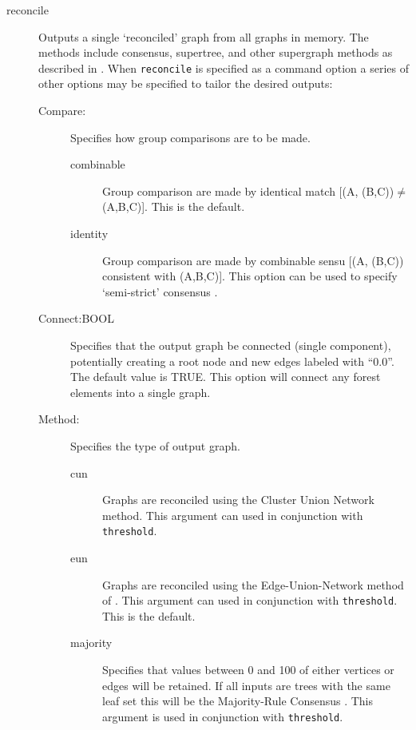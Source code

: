 \begin{description}
		\item[reconcile] Outputs a single `reconciled' graph from all graphs in 
		memory. The methods include consensus, supertree, and other supergraph 
		methods as described in \cite{Wheeler2012, Wheeler2022}. When \texttt{reconcile} 
		is specified as a command option a series of other options may be specified 
		to tailor the desired outputs:
		
		\begin{description}
			\item [Compare:] Specifies how group comparisons are to be made.
						
			\begin{description}
				\item[combinable] Group comparison are made by identical match 
				[(A, (B,C))$\neq$(A,B,C)]. This is the default.	
								
				\item[identity] Group comparison are made by combinable sensu \cite{Nelson1979}
				 [(A, (B,C)) consistent with (A,B,C)]. This option can be used to specify `semi-strict' 
				 consensus \citep{Bremer1990}.
			\end{description}
			
			\item [Connect:BOOL] Specifies that the output graph be connected 
			(single component), potentially creating a root node and new edges labeled 
			with ``0.0''. The default value is TRUE. This option will connect any forest elements
			into a single graph.
			
			\item [Method:] Specifies the type of output graph. 
			
			\begin{description}
				\item[cun] Graphs are reconciled using the Cluster Union Network 
				\citep{Baroni2005} method. This argument can used in conjunction with 
				\texttt{threshold}. 
				
				\item[eun] Graphs are reconciled using the Edge-Union-Network method of 
				\citep{MiyagiandWheeler2019}. This argument can used in conjunction with 
				\texttt{threshold}. This is the default.
				
				\item[majority] Specifies that values between 0 and 100 of either vertices or 
				edges will be retained. If all inputs are trees with the same leaf set this will 
				be the Majority-Rule Consensus \citep{MargushandMcMorris1981}. This
				argument is used in conjunction with \texttt{threshold}.


\end{description}
\end{description}
\end{description}
